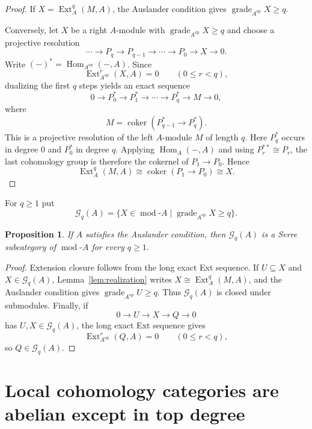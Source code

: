 \documentclass[12pt,reqno]{amsart}
\newtheorem{proposition}[theorem]{Proposition}
\theoremstyle{definition}
\theoremstyle{remark}
\newcommand{\Hom}{\operatorname{Hom}}
\newcommand{\Ext}{\operatorname{Ext}}
\newcommand{\grade}{\operatorname{grade}}
\newcommand{\modcat}{\operatorname{mod}}
\begin{document}
\begin{proof}
If $X=\Ext_A^q(M,A)$, the Auslander condition gives $\grade_{A^{\mathrm{op}}} X\ge q$.

Conversely, let $X$ be a right $A$-module with $\grade_{A^{\mathrm{op}}} X\ge q$ and choose a projective resolution
\[
\cdots\longrightarrow P_q\longrightarrow P_{q-1}\longrightarrow\cdots\longrightarrow P_0\longrightarrow X\longrightarrow0.
\]
Write $(-)^*=\Hom_{A^{\mathrm{op}}}(-,A)$.  Since
\[
\Ext^r_{A^{\mathrm{op}}}(X,A)=0
\qquad (0\le r<q),
\]
dualizing the first $q$ steps yields an exact sequence
\[
0\longrightarrow P_0^*\longrightarrow P_1^*\longrightarrow\cdots\longrightarrow P_q^*\longrightarrow M\longrightarrow0,
\]
where
\[
M=\operatorname{coker}(P_{q-1}^*\longrightarrow P_q^*).
\]
This is a projective resolution of the left $A$-module $M$ of length $q$.
Here $P_q^*$ occurs in degree $0$ and $P_0^*$ in degree $q$.  Applying
$\Hom_A(-,A)$ and using $P_r^{**}\cong P_r$, the last cohomology group is
therefore the cokernel of $P_1\to P_0$.  Hence
\[
\Ext_A^q(M,A)
\cong
\operatorname{coker}(P_1\longrightarrow P_0)
\cong X.
\]
\end{proof}

For $q\ge1$ put
\[
\mathcal G_q(A)
=
\{X\in\modcat\text{-}A\mid \grade_{A^{\mathrm{op}}} X\ge q\}.
\]

\begin{proposition}\label{prop:grade-serre}
If $A$ satisfies the Auslander condition, then $\mathcal G_q(A)$ is a Serre subcategory of $\modcat\text{-}A$ for every $q\ge1$.
\end{proposition}

\begin{proof}
Extension closure follows from the long exact Ext sequence.  If $U\subseteq X$ and $X\in\mathcal G_q(A)$, Lemma~\ref{lem:realization} writes $X\cong\Ext_A^q(M,A)$, and the Auslander condition gives $\grade_{A^{\mathrm{op}}} U\ge q$.  Thus $\mathcal G_q(A)$ is closed under submodules.  Finally, if
\[
0\longrightarrow U\longrightarrow X\longrightarrow Q\longrightarrow0
\]
has $U,X\in\mathcal G_q(A)$, the long exact Ext sequence gives
\[
\Ext^r_{A^{\mathrm{op}}}(Q,A)=0
\qquad (0\le r<q),
\]
so $Q\in\mathcal G_q(A)$.
\end{proof}

\section{Local cohomology categories are abelian except in top degree}\label{sec:finitebox}
\end{document}
